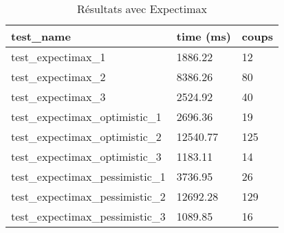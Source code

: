 \begin{table}[!ht]
    \centering
    \begin{tabular}{@{}lll@{}}
        \toprule
        test\_name & time (ms) & coups \\ \midrule
        test\_expectimax\_1 & 1886.22 & 12    \\
        test\_expectimax\_2 & 8386.26 & 80    \\
        test\_expectimax\_3 & 2524.92 & 40    \\
        test\_expectimax\_optimistic\_1 & 2696.36 & 19    \\
        test\_expectimax\_optimistic\_2 & 12540.77 & 125   \\
        test\_expectimax\_optimistic\_3 & 1183.11 & 14    \\
        test\_expectimax\_pessimistic\_1 & 3736.95 & 26    \\
        test\_expectimax\_pessimistic\_2 & 12692.28 & 129   \\
        test\_expectimax\_pessimistic\_3 & 1089.85 & 16 \\ \bottomrule
    \end{tabular}
    \caption{Résultats avec Expectimax}
\end{table}
